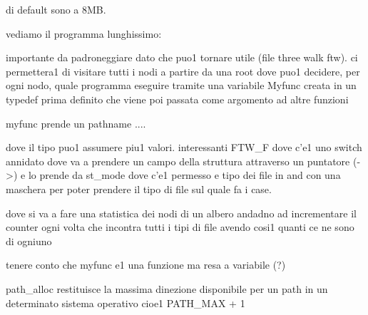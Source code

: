 di default sono a 8MB.







vediamo il programma lunghissimo:

importante da padroneggiare dato che puo1 tornare utile (file three walk ftw). ci permettera1 di visitare tutti i nodi a partire da una root dove puo1 decidere, per ogni nodo, quale programma eseguire tramite una variabile Myfunc creata in un typedef prima definito che viene poi passata come argomento ad altre funzioni


myfunc prende un pathname ....

dove il tipo puo1 assumere piu1 valori. interessanti FTW\_F dove c'e1 uno switch annidato dove va a prendere un campo della struttura attraverso un puntatore (->) e lo prende da st\_mode dove c'e1 permesso e tipo dei file in and con una maschera per poter prendere il tipo di file sul quale fa i case.

dove si va a fare una statistica dei nodi di un albero andadno ad incrementare il counter ogni volta che incontra tutti i tipi di  file avendo cosi1 quanti ce ne sono di ogniuno

tenere conto che myfunc e1 una funzione ma resa a variabile (?) 

path\_alloc restituisce la massima dinezione disponibile per un path in un determinato sistema operativo cioe1 PATH\_MAX + 1